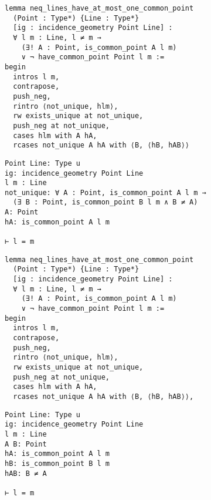\begin{frame}[fragile]
	\begin{multicols}{2}
		\begin{lstlisting}
lemma neq_lines_have_at_most_one_common_point 
  (Point : Type*) {Line : Type*} 
  [ig : incidence_geometry Point Line] :
  ∀ l m : Line, l ≠ m → 
    (∃! A : Point, is_common_point A l m) 
    ∨ ¬ have_common_point Point l m := 
begin
  intros l m,
  contrapose,
  push_neg,
  rintro ⟨not_unique, hlm⟩,
  rw exists_unique at not_unique,
  push_neg at not_unique,
  cases hlm with A hA,
  rcases not_unique A hA with ⟨B, ⟨hB, hAB⟩⟩
\end{lstlisting}
		\columnbreak
		\begin{lstlisting}
Point Line: Type u
ig: incidence_geometry Point Line
l m : Line
not_unique: ∀ A : Point, is_common_point A l m → 
  (∃ B : Point, is_common_point B l m ∧ B ≠ A)
A: Point
hA: is_common_point A l m

⊢ l = m
		\end{lstlisting}
	\end{multicols}
\end{frame}










\begin{frame}[fragile]
	\begin{multicols}{2}
		\begin{lstlisting}
lemma neq_lines_have_at_most_one_common_point 
  (Point : Type*) {Line : Type*} 
  [ig : incidence_geometry Point Line] :
  ∀ l m : Line, l ≠ m → 
    (∃! A : Point, is_common_point A l m) 
    ∨ ¬ have_common_point Point l m := 
begin
  intros l m,
  contrapose,
  push_neg,
  rintro ⟨not_unique, hlm⟩,
  rw exists_unique at not_unique,
  push_neg at not_unique,
  cases hlm with A hA,
  rcases not_unique A hA with ⟨B, ⟨hB, hAB⟩⟩,
\end{lstlisting}
		\columnbreak
		\begin{lstlisting}
Point Line: Type u
ig: incidence_geometry Point Line
l m : Line
A B: Point
hA: is_common_point A l m
hB: is_common_point B l m
hAB: B ≠ A

⊢ l = m
\end{lstlisting}
	\end{multicols}
\end{frame}










